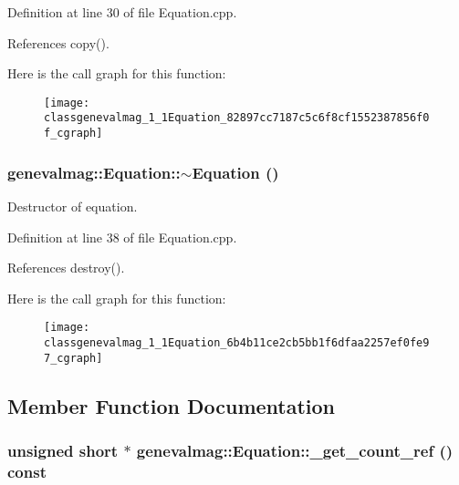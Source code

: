 Definition at line 30 of file Equation.cpp.

References copy().

Here is the call graph for this function:\nopagebreak
\begin{figure}[H]
\begin{center}
\leavevmode
\texttt{[image: classgenevalmag\_1\_1Equation\_82897cc7187c5c6f8cf1552387856f0f\_cgraph]}
\end{center}
\end{figure}
\hypertarget{classgenevalmag_1_1Equation_6b4b11ce2cb5bb1f6dfaa2257ef0fe97}{
\subsubsection[{$\sim$Equation}]{\setlength{\rightskip}{0pt plus 5cm}genevalmag::Equation::$\sim$Equation ()}}
\label{classgenevalmag_1_1Equation_6b4b11ce2cb5bb1f6dfaa2257ef0fe97}


Destructor of equation. 

Definition at line 38 of file Equation.cpp.

References destroy().

Here is the call graph for this function:\nopagebreak
\begin{figure}[H]
\begin{center}
\leavevmode
\texttt{[image: classgenevalmag\_1\_1Equation\_6b4b11ce2cb5bb1f6dfaa2257ef0fe97\_cgraph]}
\end{center}
\end{figure}


\subsection{Member Function Documentation}
\hypertarget{classgenevalmag_1_1Equation_b900ac60c5c2b4427970f7d68361db20}{
\subsubsection[{\_\-get\_\-count\_\-ref}]{\setlength{\rightskip}{0pt plus 5cm}unsigned short $\ast$ genevalmag::Equation::\_\-get\_\-count\_\-ref () const}}
\label{classgenevalmag_1_1Equation_b900ac60c5c2b4427970f7d68361db20}


